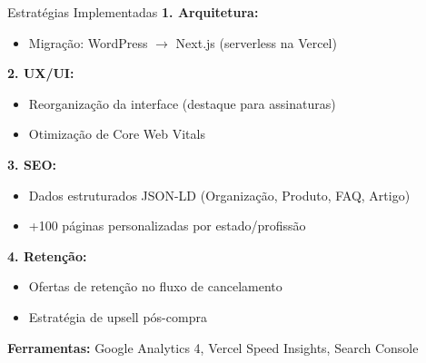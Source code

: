 \documentclass{beamer}
\begin{document}
    \begin{frame}{Estratégias Implementadas}
        \textbf{1. Arquitetura:}
        \begin{itemize}
            \item Migração: WordPress $\rightarrow$ Next.js (serverless na Vercel)
        \end{itemize}

        \vspace{0.2cm}

        \textbf{2. UX/UI:}
        \begin{itemize}
            \item Reorganização da interface (destaque para assinaturas)
            \item Otimização de Core Web Vitals
        \end{itemize}

        \vspace{0.2cm}

        \textbf{3. SEO:}
        \begin{itemize}
            \item Dados estruturados JSON-LD (Organização, Produto, FAQ, Artigo)
            \item +100 páginas personalizadas por estado/profissão
        \end{itemize}

        \vspace{0.2cm}

        \textbf{4. Retenção:}
        \begin{itemize}
            \item Ofertas de retenção no fluxo de cancelamento
            \item Estratégia de upsell pós-compra
        \end{itemize}

        \vspace{0.2cm}

        \textbf{Ferramentas:} Google Analytics 4, Vercel Speed Insights, Search Console
    \end{frame}

\end{document}
